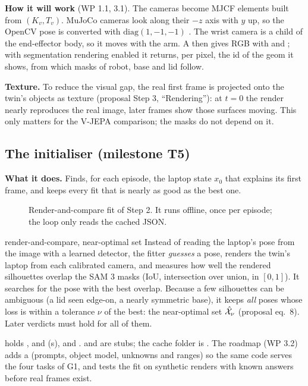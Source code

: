 \textbf{How it will work} \planned{} (WP 1.1, 3.1). The cameras become MJCF  elements built from $(K_v,T_v)$. MuJoCo cameras look along their $-z$ axis with $y$ up, so the OpenCV pose is converted with $\mathrm{diag}(1,-1,-1)$ \chk. The wrist camera is a child of the end-effector body, so it moves with the arm. A  then gives RGB with  and ; with segmentation rendering enabled it returns, per pixel, the id of the geom it shows, from which masks of robot, base and lid follow.

\textbf{Texture.} To reduce the visual gap, the real first frame is projected onto the twin's objects as texture (proposal Step 3, ``Rendering''): at $t=0$ the render nearly reproduces the real image, later frames show those surfaces moving. This only matters for the V-JEPA comparison; the masks do not depend on it.

\subsection{The initialiser (milestone T5) \skel}\label{twin:sec:init}
\textbf{What it does.} Finds, for each episode, the laptop state $x_0$ that explains its first frame, and keeps every fit that is nearly as good as the best one.

\begin{figure}[h]
\centering

\caption{Render-and-compare fit of Step 2. It runs offline, once per episode; the loop only reads the cached JSON.}
\label{twin:fig:init}
\end{figure}

\begin{newc}{render-and-compare, near-optimal set}
Instead of reading the laptop's pose from the image with a learned detector, the fitter \emph{guesses} a pose, renders the twin's laptop from each calibrated camera, and measures how well the rendered silhouettes overlap the SAM 3 masks (IoU, intersection over union, in $[0,1]$). It searches for the pose with the best overlap. Because a few silhouettes can be ambiguous (a lid seen edge-on, a nearly symmetric base), it keeps \emph{all} poses whose loss is within a tolerance $\nu$ of the best: the near-optimal set $\hat{\mathcal X}_\nu$ (proposal eq.~8). Later verdicts must hold for all of them.
\end{newc}

\begin{incode}
 holds ,  and  (s),  and .  and  are stubs; the cache folder is . The roadmap (WP 3.2) adds a  (prompts, object model, unknowns and ranges) so the same code serves the four tasks of G1, and tests the fit on synthetic renders with known answers before real frames exist.
\end{incode}

